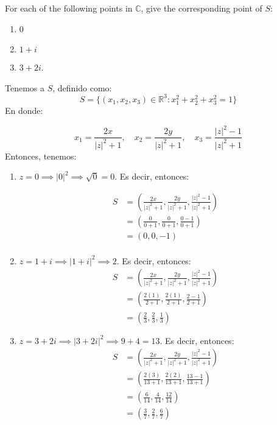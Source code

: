 





\begin{problema}
    For each of the following points in $\mathbb{C}$, give the corresponding point of $S$: 
    \begin{enumerate}
        \item 0
        \item $1+i$
        \item $3+2i$.
    \end{enumerate}

    \begin{sol}
        Tenemos a $S$, definido como: 
        $$ S= \{(x_1,x_2,x_3)\in \mathbb{R}^3: x_1^2+x_2^2 +x_3^2=1\}$$
        En donde: 


        $$x_1 = \frac{2x}{|z|^2+1 },\quad 
        x_2 = \frac{2y}{|z|^2+1 }, \quad 
        x_3 = \frac{|z|^2-1}{|z|^2+1}$$
        Entonces, tenemos: 
        \begin{enumerate}
            \item $z= 0\implies |0|^2 \implies \sqrt{0} = 0$. Es decir, entonces: 

            \begin{align*}
                S &= \left(\frac{2x}{|z|^2+1 },\frac{2y}{|z|^2+1 },\frac{|z|^2-1}{|z|^2+1}\right)\\
                &= \left(\frac{0}{0+1 },\frac{0}{0+1 },\frac{0-1}{0+1}\right)\\
                &= \left(0,0,-1\right)\\
            \end{align*}
            \item $z= 1+i\implies |1+i|^2 \implies 2$. Es decir, entonces: 
            \begin{align*}
                S &= \left(\frac{2x}{|z|^2+1 },\frac{2y}{|z|^2+1 },\frac{|z|^2-1}{|z|^2+1}\right)\\ 
                &= \left(\frac{2(1)}{2+1 },\frac{2(1)}{2+1 },\frac{2-1}{2+1}\right)\\
                &=  \left(\frac{2}{3},\frac{2}{3},\frac{1}{3}\right)
            \end{align*}
            \item $z= 3+2i\implies |3+2i|^2 \implies 9+4 = 13$. Es decir, entonces: 
            \begin{align*}
                S &= \left(\frac{2x}{|z|^2+1 },\frac{2y}{|z|^2+1 },\frac{|z|^2-1}{|z|^2+1}\right)\\
                &= \left(\frac{2(3)}{13+1 },\frac{2(2)}{13+1 },\frac{13-1}{13+1}\right)\\ 
                &= \left(\frac{6}{14 },\frac{4}{14 },\frac{12}{14}\right)\\
                &= \left(\frac{3}{7},\frac{2}{7},\frac{6}{7}\right)\\
            \end{align*}
        \end{enumerate}
    \end{sol}
\end{problema}


%
%

